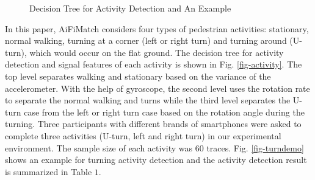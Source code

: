 \documentclass{llncs}
\begin{document}
\vspace{-20pt}
\begin{figure}[!ht]
	\centering
	\vfil
	\caption{Decision Tree for Activity Detection and An Example}
\end{figure}
\vspace{-10pt}

In this paper, AiFiMatch considers four types of pedestrian activities: stationary, normal walking, turning at a corner (left or right turn) and turning around (U-turn), which would occur on the flat ground. The decision tree for activity detection and signal features of each activity is shown in Fig. \ref{fig-activity}. The top level separates walking and stationary based on the variance of the accelerometer. With the help of gyroscope, the second level uses the rotation rate to separate the normal walking and turns while the third level separates the U-turn case from the left or right turn case based on the rotation angle during the turning. Three participants with different brands of smartphones were asked to complete three activities (U-turn, left and right turn) in our experimental environment. The sample size of each activity was $60$ traces. Fig. \ref{fig-turndemo} shows an example for turning activity detection and the activity detection result is summarized in Table $1$.
\end{document}

